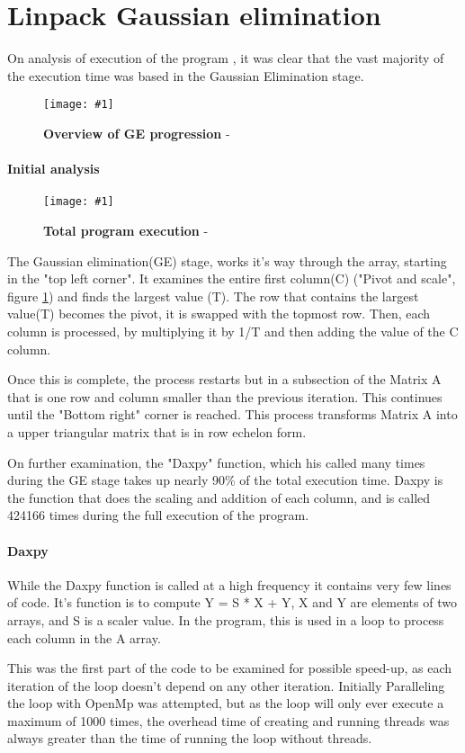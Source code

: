 \documentclass[conference]{acmsiggraph}
\newcommand{\figuremacroW}[4]{
	\begin{figure}[h] %
		\centering
		\texttt{[image: \#1]}
		\caption[#2]{\textbf{#2} - #3}
		\label{fig:#1}
	\end{figure}
}
\begin{document}
\section{Linpack Gaussian elimination}
On analysis of execution of the program , it was clear that the vast majority of the execution time was based in the Gaussian Elimination stage.

\figuremacroW
{linpackmat}
{Overview of GE progression}
{}
{1.0}

\paragraph{Initial analysis}
\figuremacroW
{pie}
{Total program execution}
{}
{0.8}

The Gaussian elimination(GE) stage, works it's way through the array, starting in the "top left corner".
It examines the entire first column(C) ("Pivot and scale", figure \ref{fig:linpackmat}) and finds the largest value (T).
The row that contains the largest value(T) becomes the pivot, it is swapped with the topmost row.
Then, each column is processed, by multiplying it by 1/T and then adding the value of the C column.

Once this is complete, the process restarts but in a subsection of the Matrix A that is one row and column smaller than the previous iteration.
This continues until the "Bottom right" corner is reached. This process transforms Matrix A into a upper triangular matrix that is in row echelon form.

On further examination, the "Daxpy" function, which his called many times during the GE stage takes up nearly 90\% of the total execution time.
Daxpy is the function that does the scaling and addition of each column, and is called 424166 times during the full execution of the program.

\paragraph{Daxpy}
While the Daxpy function is called at a high frequency it contains very few lines of code.
It's function is to compute Y = S * X + Y, X and Y are elements of two arrays, and S is a scaler value.
In the program, this is used in a loop to process each column in the A array.

This was the first part of the code to be examined for possible speed-up, as each iteration of the loop doesn't depend on any other iteration.
Initially Paralleling the loop with OpenMp was attempted, but as the loop will only ever execute a maximum of 1000 times,
 the overhead time of creating and running threads was always greater than the time of running the loop without threads.
 
\end{document}

